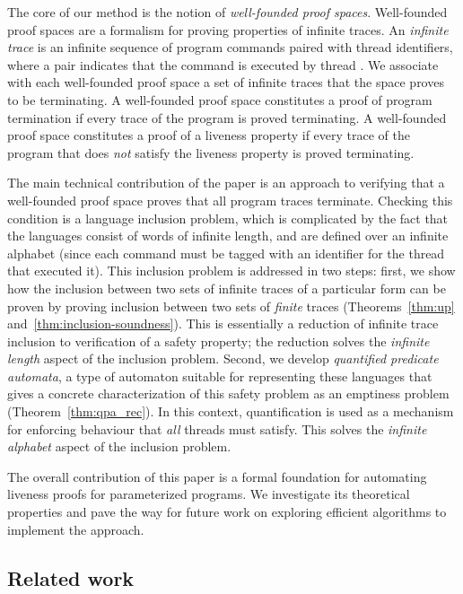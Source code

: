 \documentclass[9pt,nocopyrightspace]{sigplanconf}
\theoremstyle{definition}
\begin{document}
The core of our method is the notion of \emph{well-founded proof spaces}.
Well-founded proof spaces are a formalism for proving properties of infinite
traces.  An \emph{infinite trace} is an infinite sequence of program commands
paired with thread identifiers, where a pair  indicates
that the command  is executed by thread .  We associate with
each well-founded proof space a set of infinite traces that the space proves
to be terminating.  A well-founded proof space constitutes a proof of program
termination if every trace of the program is proved terminating.  A well-founded proof space
constitutes a proof of a liveness property if every trace of the program that
does \emph{not} satisfy the liveness property is proved terminating.




The main technical contribution of the paper is an approach to verifying that
a well-founded proof space proves that all program traces terminate.  Checking this condition is a language inclusion
problem, which is complicated by the fact that the languages consist of words
of infinite length, and are defined over an infinite alphabet (since each
command must be tagged with an identifier for the thread that executed it).
This inclusion problem
is addressed in two steps: first, we show how the inclusion between two sets
of infinite traces of a particular form can be proven by proving inclusion
between two sets of \emph{finite} traces
(Theorems~\ref{thm:up} and~\ref{thm:inclusion-soundness}).  This is essentially a reduction of
infinite trace inclusion to verification of a safety property; the reduction
solves the \emph{infinite length} aspect of the inclusion problem.  Second, we
develop \emph{quantified predicate automata}, a type of automaton suitable for
representing these languages that gives a concrete characterization of this
safety problem as an emptiness problem
(Theorem~\ref{thm:qpa_rec}).  In this context, quantification is used as a mechanism for
enforcing behaviour that \emph{all} threads must satisfy.  This solves the
\emph{infinite alphabet} aspect of the inclusion problem.

The overall contribution of this paper is a formal foundation for automating
liveness proofs for parameterized programs.  We investigate its theoretical
properties and pave the way for future work on exploring efficient algorithms
to implement the approach.





\subsection{Related work} \label{sec:relwork}
\end{document}
